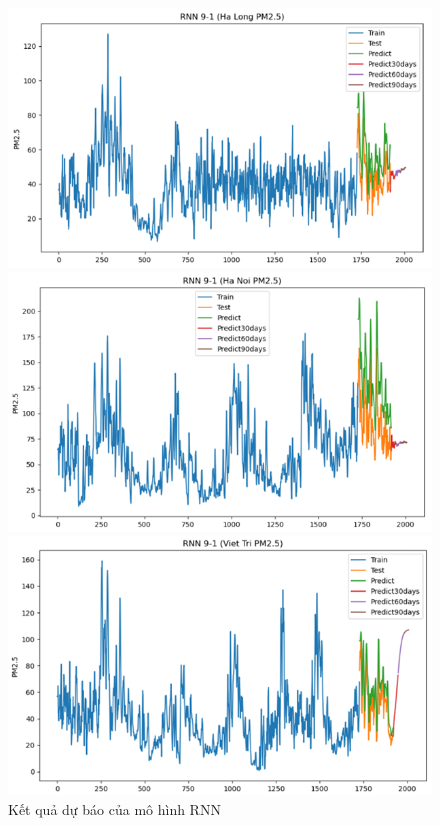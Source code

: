 \begin{figure}[H]
        \begin{minipage}{0.15\textwidth}
            \centering
            \includegraphics[width=1\textwidth]{img/final/RNN/90D/RNN_9_1_HL.png}
            \end{minipage}
            \hfill
            \begin{minipage}{0.15\textwidth}
            \centering
            \includegraphics[width=1\textwidth]{img/final/RNN/90D/RNN_9_1_HN.png}
            \end{minipage}
            \hfill
            \begin{minipage}{0.15\textwidth}
            \centering
            \includegraphics[width=1\textwidth]{img/final/RNN/90D/RNN_9_1_VT.png}
            \end{minipage}
            \hfill
    
    \caption{Kết quả dự báo của mô hình RNN}
    \label{fig:rnn}
\end{figure}
